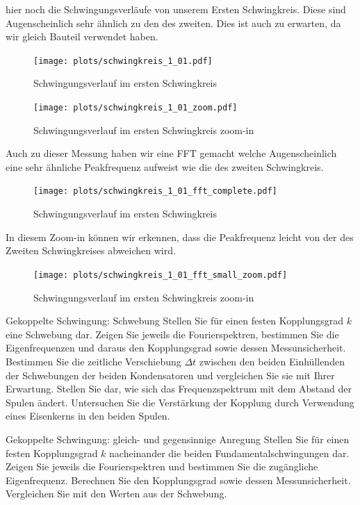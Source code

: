 \documentclass[twoside]{protokoll}
\begin{document}
hier noch die Schwingungsverläufe von unserem Ersten Schwingkreis. Diese sind Augenscheinlich sehr ähnlich zu den des zweiten.
Dies ist auch zu erwarten, da wir gleich Bauteil verwendet haben.

\begin{figure}[H]
    \centering
    \texttt{[image: plots/schwingkreis\_1\_01.pdf]}
    \caption{Schwingungsverlauf im ersten Schwingkreis}
\end{figure}


\begin{figure}[H]
    \centering
    \texttt{[image: plots/schwingkreis\_1\_01\_zoom.pdf]}
    \caption{Schwingungsverlauf im ersten Schwingkreis zoom-in}
\end{figure}

Auch zu dieser Messung haben wir eine FFT gemacht welche Augenscheinlich eine sehr ähnliche Peakfrequenz aufweist wie die des zweiten Schwingkreis.

\begin{figure}[H]
    \centering
    \texttt{[image: plots/schwingkreis\_1\_01\_fft\_complete.pdf]}
    \caption{Schwingungsverlauf im ersten Schwingkreis}
\end{figure}

In diesem Zoom-in können wir erkennen, dass die Peakfrequenz leicht von der des Zweiten Schwingkreises abweichen wird.

\begin{figure}[H]
    \centering
    \texttt{[image: plots/schwingkreis\_1\_01\_fft\_small\_zoom.pdf]}
    \caption{Schwingungsverlauf im ersten Schwingkreis zoom-in}
\end{figure}


\begin{aufgabe}{Gekoppelte Schwingung: Schwebung}
  Stellen Sie für einen festen Kopplungsgrad $k$ eine Schwebung
  dar. Zeigen Sie jeweils die Fourierspektren, bestimmen Sie die
  Eigenfrequenzen und daraus den Kopplungsgrad sowie dessen
  Messunsicherheit. Bestimmen Sie die zeitliche Verschiebung
  $\Delta{}t$ zwischen den beiden Einhüllenden der Schwebungen der
  beiden Kondensatoren und vergleichen Sie sie mit Ihrer
  Erwartung. Stellen Sie dar, wie sich das Frequenzspektrum mit dem
  Abstand der Spulen ändert. Untersuchen Sie die Verstärkung der
  Kopplung durch Verwendung eines Eisenkerns in den beiden Spulen.
\end{aufgabe}


\begin{aufgabe}{Gekoppelte Schwingung: gleich- und gegensinnige Anregung}
  Stellen Sie für einen festen Kopplungsgrad $k$ nacheinander die
  beiden Fundamentalschwingungen dar. Zeigen Sie jeweils die
  Fourierspektren und bestimmen Sie die zugängliche
  Eigenfrequenz. Berechnen Sie den Kopplungsgrad sowie dessen
  Messunsicherheit. Vergleichen Sie mit den Werten aus der Schwebung.
\end{aufgabe}
   
   
\end{document}
